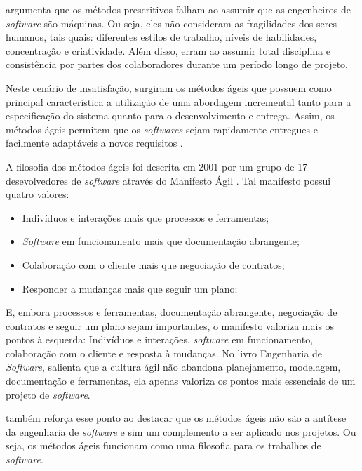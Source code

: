 \documentclass[
    12pt,       %
    openright,      %
    twoside,      %
    a4paper,      %
    english,      %
    french,       %
    spanish,      %
    brazil,       %
    ]{abntex2}
\begin{document}
 argumenta que os métodos prescritivos falham ao assumir que as engenheiros de \textit{software} são máquinas. Ou seja, eles não consideram as fragilidades dos seres humanos, tais quais: diferentes estilos de trabalho, níveis de habilidades, concentração e criatividade. Além disso, erram ao assumir total disciplina e consistência por partes dos colaboradores durante um período longo de projeto.

Neste cenário de insatisfação, surgiram os métodos ágeis que possuem como principal característica a utilização de uma abordagem incremental tanto para a especificação do sistema quanto para o desenvolvimento e entrega. Assim, os métodos ágeis permitem que os \textit{softwares} sejam rapidamente entregues e facilmente adaptáveis a novos requisitos \cite{SOMMERVILLE:2011}.

A filosofia dos métodos ágeis foi descrita em 2001 por um grupo de 17 desevolvedores de \textit{software} através do Manifesto Ágil \cite{AGILEMANIFEST:2001}. Tal manifesto possui quatro valores:

\begin{itemize}
        \item Indivíduos e interações mais que processos e ferramentas;
        \item \textit{Software} em funcionamento mais que documentação abrangente;
        \item Colaboração com o cliente mais que negociação de contratos;
        \item Responder a mudanças mais que seguir um plano;
\end{itemize}

E, embora processos e ferramentas, documentação abrangente, negociação de contratos e seguir um plano sejam importantes, o manifesto valoriza mais os pontos à esquerda: Indivíduos e interações, \textit{software} em funcionamento, colaboração com o cliente e resposta à mudanças. No livro Engenharia de \textit{Software},  salienta que a cultura ágil não abandona planejamento, modelagem, documentação e ferramentas, ela apenas valoriza os pontos mais essenciais de um projeto de \textit{software}.

 também reforça esse ponto ao destacar que os métodos ágeis não são a antítese da engenharia de \textit{software} e sim um complemento a ser aplicado nos projetos. Ou seja, os métodos ágeis funcionam como uma filosofia para os trabalhos de \textit{software}.
\end{document}
